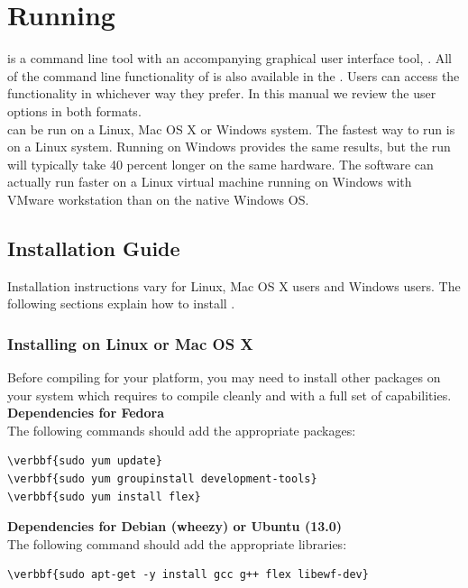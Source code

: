 \documentclass[11pt]{article} %
\begin{document}
\section{Running \bulk}
\bulk is a command line tool with an accompanying graphical user interface tool, \viewer. All of the command line functionality of \bulk is also available in the \viewer. Users can access the functionality in whichever way they prefer. In this manual we review the \bulk user options in both formats.\\

\bulk can be run on a Linux, Mac OS X or Windows system. The fastest way to run \bulk is on a Linux system. Running \bulk on Windows provides the same results, but the run will typically take 40 percent longer on the same hardware. The software can actually run faster on a Linux virtual machine running on Windows with VMware workstation than on the native Windows OS. 


\subsection{Installation Guide}
Installation instructions vary for Linux, Mac OS X users and Windows users. The following sections explain how to install \bulk.

\subsubsection{Installing on Linux or Mac OS X}
\label{InstallOnLinuxMac}
Before compiling \bulk for your platform, you may need to install other packages on your system which \bulk requires to compile cleanly and with a full set of capabilities.\\

\textbf{Dependencies for Fedora}\\
The following commands should add the appropriate packages:
\begin{Verbatim}[commandchars=\\\{\}]
\verbbf{sudo yum update}
\verbbf{sudo yum groupinstall development-tools}
\verbbf{sudo yum install flex}
\end{Verbatim}

\textbf{Dependencies for Debian (wheezy) or Ubuntu (13.0)}\\
The following command should add the appropriate libraries:
\begin{Verbatim}[commandchars=\\\{\}]
\verbbf{sudo apt-get -y install gcc g++ flex libewf-dev} 
\end{Verbatim}
\end{document}

